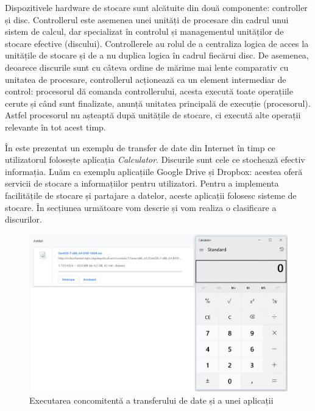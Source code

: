 Dispozitivele hardware de stocare sunt alcătuite din două componente: controller și disc.
Controllerul este asemenea unei unități de procesare din cadrul unui sistem de calcul, dar specializat în controlul și managementul unităților de stocare efective (discului).
Controllerele au rolul de a centraliza logica de acces la unitățile de stocare și de a nu duplica logica în cadrul fiecărui disc.
De asemenea, deoarece discurile sunt cu câteva ordine de mărime mai lente comparativ cu unitatea de procesare, controllerul acționează ca un element intermediar de control: procesorul dă comanda controllerului, acesta execută toate operațiile cerute și când sunt finalizate, anunță unitatea principală de execuție (procesorul).
Astfel procesorul nu așteaptă după unitățile de stocare, ci execută alte operații relevante în tot acest timp.

În  este prezentat un exemplu de transfer de date din Internet în timp ce utilizatorul folosește aplicația \textit{Calculator}.
Discurile sunt cele ce stochează efectiv informația.
Luăm ca exemplu aplicațiile Google Drive și Dropbox: acestea oferă servicii de stocare a informațiilor pentru utilizatori.
 Pentru a implementa facilitățile de stocare și partajare a datelor, aceste aplicații folosesc sisteme de stocare.
În secțiunea următoare vom descrie și vom realiza o clasificare a discurilor.

\begin{figure}[!htbp]
  \centering
  \includegraphics[width=15cm]{chapters/10-storage/img/concurrent-img.png}
  \caption{Executarea concomitentă a transferului de date și a unei aplicații}
  \label{fig:storage:concurrent-access}
\end{figure}

